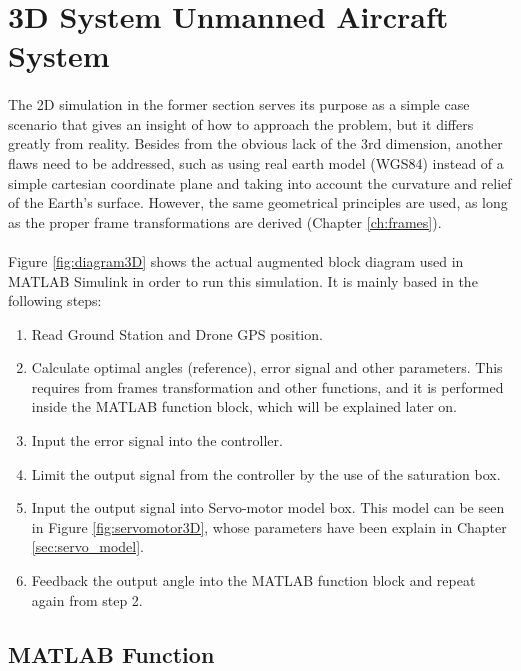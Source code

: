 
\section{3D System Unmanned Aircraft System}\label{sec:3d_sim}

\paragraph{}The 2D simulation in the former section serves its purpose as a simple case scenario that gives an insight of how to approach the problem, but it differs greatly from reality. Besides from the obvious lack of the 3rd dimension, another flaws need to be addressed, such as using real earth model (WGS84) instead of a simple cartesian coordinate plane  and taking into account the curvature and relief of the Earth's surface. However, the same geometrical principles are used, as long as the proper frame transformations are derived (Chapter \ref{ch:frames}).

\paragraph{} Figure \ref{fig:diagram3D} shows the actual augmented block diagram used in MATLAB Simulink in order to run this simulation. It is mainly based in the following steps:
\begin{enumerate}
\item{Read Ground Station and Drone GPS position.}
\item{Calculate optimal angles (reference), error signal and other parameters. This requires from frames transformation and other functions, and it is performed inside the MATLAB function block, which will be explained later on.}
\item{Input the error signal into the controller.}
\item{Limit the output signal from the controller by the use of the saturation box.}
\item{Input the output signal into Servo-motor model box. This model can be seen in Figure \ref{fig:servomotor3D}, whose parameters have been explain in Chapter \ref{sec:servo_model}.}
\item{Feedback the output angle into the MATLAB function block and repeat again from step 2.}
\end{enumerate}

\subsection*{MATLAB Function}
